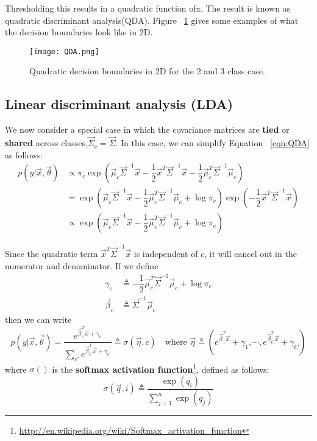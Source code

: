 Thresholding this results in a quadratic function ofx. The result is known as quadratic discriminant analysis(QDA). Figure ~\ref{fig:QDA} gives some examples of what the decision boundaries look like in 2D.

\begin{figure}[hbtp]
\centering
    \texttt{[image: QDA.png]}
\caption{Quadratic decision boundaries in 2D for the 2 and 3 class case.}
\label{fig:QDA} 
\end{figure}


\subsection{Linear discriminant analysis (LDA)}
\label{sec:Linear-discriminant-analysis}
We now consider a special case in which the covariance matrices are \textbf{tied} or \textbf{shared} across classes,$\vec{\Sigma}_c=\vec{\Sigma}$. In this case, we can simplify Equation ~\eqref{eqn:QDA} as follows:
\begin{align}
p(y|\vec{x},\vec{\theta})& \propto \pi_c\exp\left(\vec{\mu}_c\vec{\Sigma}^{-1}\vec{x}-\dfrac{1}{2}\vec{x}^T\vec{\Sigma}^{-1}\vec{x}-\dfrac{1}{2}\vec{\mu}_c^T\vec{\Sigma}^{-1}\vec{\mu}_c\right) \\
 & =\exp\left(\vec{\mu}_c\vec{\Sigma}^{-1}\vec{x}-\dfrac{1}{2}\vec{\mu}_c^T\vec{\Sigma}^{-1}\vec{\mu}_c+\log \pi_c\right)\exp\left(-\dfrac{1}{2}\vec{x}^T\vec{\Sigma}^{-1}\vec{x}\right) \\
 & \propto \exp\left(\vec{\mu}_c\vec{\Sigma}^{-1}\vec{x}-\dfrac{1}{2}\vec{\mu}_c^T\vec{\Sigma}^{-1}\vec{\mu}_c+\log \pi_c\right)
\end{align}

Since the quadratic term $\vec{x}^T\vec{\Sigma}^{-1}\vec{x}$ is independent of $c$, it will cancel out in the numerator and denominator. If we define
\begin{align}
\gamma_c& \triangleq -\dfrac{1}{2}\vec{\mu}_c^T\vec{\Sigma}^{-1}\vec{\mu}_c+\log \pi_c \\
\vec{\beta}_c& \triangleq \vec{\Sigma}^{-1}\vec{\mu}_c
\end{align}
then we can write
\begin{equation}\label{eqn:LDA}
p(y|\vec{x},\vec{\theta})=\dfrac{e^{\vec{\beta}_c^T\vec{x}+\gamma_c}}{\sum_{c'}e^{\vec{\beta}_{c'}^T\vec{x}+\gamma_{c'}}} \triangleq \sigma(\vec{\eta}, c) \quad \text{where } \vec{\eta} \triangleq (e^{\vec{\beta}_1^T\vec{x}}+\gamma_1,\cdots, e^{\vec{\beta}_C^T\vec{x}}+\gamma_C)
\end{equation}
where $\sigma()$ is the \textbf{softmax activation function}\footnote{\url{http://en.wikipedia.org/wiki/Softmax_activation_function}}, defined as follows:
\begin{equation}
\sigma(\vec{q},i) \triangleq \dfrac{\exp(q_i)}{\sum_{j=1}^n \exp(q_j)}
\end{equation}

